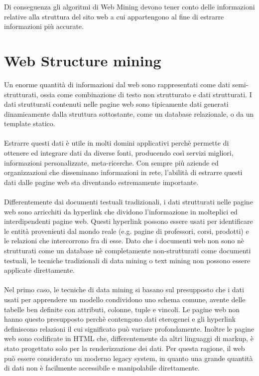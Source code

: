 Di conseguenza gli algoritmi di Web Mining devono tener conto delle informazioni relative alla struttura del sito web a cui appartengono al fine di estrarre informazioni più accurate.

\section{Web Structure mining}
\label{subsec:webstructure}
Un enorme quantità di informazioni dal web sono rappresentati come dati semi-strutturati, ossia come combinazione di testo non strutturato e dati strutturati. I dati strutturati contenuti nelle pagine web sono tipicamente dati generati dinamicamente dalla struttura sottostante, come un database relazionale, o da un template statico.
\\\\
Estrarre questi dati è utile in molti domini applicativi perchè permette di ottenere ed integrare dati da diverse fonti, producendo così servizi migliori, informazioni personalizzate, meta-ricerche. Con sempre più aziende ed organizzazioni che disseminano informazioni in rete, l’abilità di estrarre questi dati dalle pagine web sta diventando estremamente importante.
\\\\
Differentemente dai documenti testuali tradizionali, i dati strutturati nelle pagine web sono arricchiti da hyperlink che dividono l’informazione in molteplici ed interdipendenti pagine web. Questi hyperlink possono essere usati per identificare le entità provenienti dal mondo reale (e.g. pagine di professori, corsi, prodotti) e le relazioni che intercorrono fra di esse. Dato che i documenti web non sono nè strutturati come un database nè completamente non-strutturati come documenti testuali, le tecniche tradizionali di data mining o text mining non possono essere applicate direttamente. 
\\\\
Nel primo caso, le tecniche di data mining si basano sul presupposto che i dati usati per apprendere un modello condividono uno schema comune, avente delle tabelle ben definite con attributi, colonne, tuple e vincoli. Le pagine web non hanno questo presupposto perchè contengono dati eterogenei e gli hyperlink definiscono relazioni il cui significato può variare profondamente. Inoltre le pagine web sono codificate in HTML che, differentemente da altri linguaggi di markup, è stato progettato solo per la renderizzazione dei dati. Per questa ragione, il web può essere considerato un moderno legacy system, in quanto una grande quantità di dati non è facilmente accessibile e manipolabile direttamente. 
